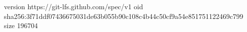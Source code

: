 version https://git-lfs.github.com/spec/v1
oid sha256:3f71ddf07436675031de63b055b90c108c4b44c50cf9a54e851751122469c799
size 196704

